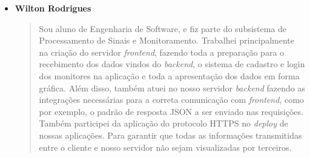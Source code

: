 \begin{itemize}
  \item \textbf{Wilton Rodrigues}
    \begin{quote}
      Sou aluno de Engenharia de Software, e fiz parte do subsistema de
      Processamento de Sinais e Monitoramento. Trabalhei principalmente na
      criação do servidor \textit{frontend}, fazendo toda a preparação para o recebimento
      dos dados vindos do \textit{backend}, o sistema de cadastro e login
      dos monitores na aplicação e toda a apresentação dos dados em forma gráfica.
      Além disso, também atuei no nosso servidor \textit{backend} fazendo as
      integrações necessárias para a correta comunicação com \textit{frontend},
      como por exemplo, o padrão de resposta JSON a ser enviado nas requisições.
      Também participei da aplicação do protocolo HTTPS no \textit{deploy} de
      nossas aplicações. Para garantir que todas as informações transmitidas
      entre o cliente e nosso servidor não sejam visualizadas por terceiros.
    \end{quote}
\end{itemize}
